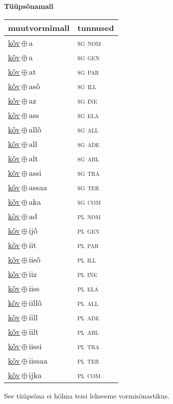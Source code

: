 

\vspace{3.5em}
\noindent \begin{minipage}{\textwidth}
\noindent \textbf{Tüüpsõnamall \,}\\

\begin{sideways}
\begin{tabular}{l l}
muutvormimall & tunnused \\
\hline
\underline{kõv}\,$\oplus$\,a & \textsc{ sg nom } \\
\underline{kõv}\,$\oplus$\,a & \textsc{ sg gen } \\
\underline{kõv}\,$\oplus$\,at & \textsc{ sg par } \\
\underline{kõv}\,$\oplus$\,asõ & \textsc{ sg ill } \\
\underline{kõv}\,$\oplus$\,az & \textsc{ sg ine } \\
\underline{kõv}\,$\oplus$\,ass & \textsc{ sg ela } \\
\underline{kõv}\,$\oplus$\,allõ & \textsc{ sg all } \\
\underline{kõv}\,$\oplus$\,all & \textsc{ sg ade } \\
\underline{kõv}\,$\oplus$\,alt & \textsc{ sg abl } \\
\underline{kõv}\,$\oplus$\,assi & \textsc{ sg tra } \\
\underline{kõv}\,$\oplus$\,assaa & \textsc{ sg ter } \\
\underline{kõv}\,$\oplus$\,aka & \textsc{ sg com } \\
\underline{kõv}\,$\oplus$\,ad & \textsc{ pl nom } \\
\underline{kõv}\,$\oplus$\,ijõ & \textsc{ pl gen } \\
\underline{kõv}\,$\oplus$\,iit & \textsc{ pl par } \\
\underline{kõv}\,$\oplus$\,iisõ & \textsc{ pl ill } \\
\underline{kõv}\,$\oplus$\,iiz & \textsc{ pl ine } \\
\underline{kõv}\,$\oplus$\,iiss & \textsc{ pl ela } \\
\underline{kõv}\,$\oplus$\,iillõ & \textsc{ pl all } \\
\underline{kõv}\,$\oplus$\,iill & \textsc{ pl ade } \\
\underline{kõv}\,$\oplus$\,iilt & \textsc{ pl abl } \\
\underline{kõv}\,$\oplus$\,iissi & \textsc{ pl tra } \\
\underline{kõv}\,$\oplus$\,iissaa & \textsc{ pl ter } \\
\underline{kõv}\,$\oplus$\,ijka & \textsc{ pl com } \\
\end{tabular}
\end{sideways}
\label{tab:tüüpsõnamall-kõva}

\end{minipage}

 
\vspace{1em}
\noindent See tüüpsõna ei hõlma teisi lekseeme vormi\-sõnastikus.

